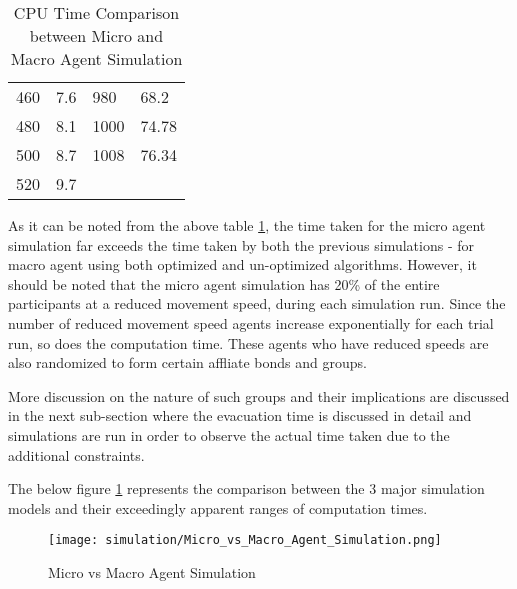 \begin{table}
\begin{adjustbox}{angle=270}
{\begin{tabular}{|l|l|l|l|}
460      & 7.6                                                         & 980      & 68.2                                                         \\
480      & 8.1                                                         & 1000     & 74.78                                                        \\
500      & 8.7                                                         & 1008     & 76.34                                                        \\
520      & 9.7                                                         &          &                                                              \\
\hline
\end{tabular}}
\end{adjustbox}
\caption{CPU Time Comparison between Micro and Macro Agent Simulation}
\label{CPU Time Comparison between Micro and Macro Agent Simulation}
\end{table}  

As it can be noted from the above table \ref{CPU Time Comparison between Micro and Macro Agent Simulation}, the time taken for the micro agent simulation far exceeds the time taken by both the previous simulations - for macro agent using both optimized and un-optimized algorithms. However, it should be noted that the micro agent simulation has 20\% of the entire participants at a reduced movement speed, during each simulation run. Since the number of reduced movement speed agents increase exponentially for each trial run, so does the computation time. These agents who have reduced speeds are also randomized to form certain affliate bonds and groups. 

More discussion on the nature of such groups and their implications are discussed in the next sub-section where the evacuation time is discussed in detail and simulations are run in order to observe the actual time taken due to the additional constraints.

The below figure \ref{Micro vs Macro Agent Simulation} represents the comparison between the 3 major simulation models and their exceedingly apparent ranges of computation times. 

\begin{figure}[H]
  \centering
  \texttt{[image: simulation/Micro\_vs\_Macro\_Agent\_Simulation.png]}
  \caption{Micro vs Macro Agent Simulation}
  \label{Micro vs Macro Agent Simulation}
\end{figure}

